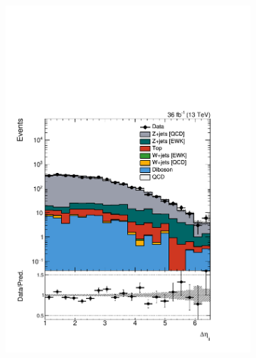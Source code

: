 \begin{figure}[]
\begin{center}
\begin{subfigure}[t]{0.24\textwidth}
            \includegraphics[width=\textwidth]{figures/vbf/prefit/dimuon_jot12DEta_logy.pdf}
        \end{subfigure}
        \begin{subfigure}[t]{0.24\textwidth}

\end{subfigure}
\end{center}
\end{figure}
